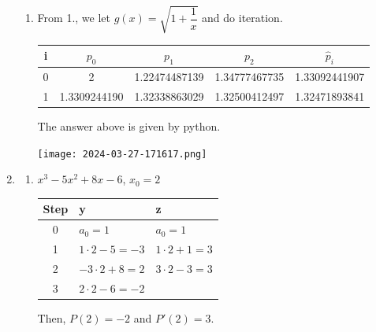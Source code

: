 \documentclass[12pt]{article}
\begin{document}
\begin{enumerate}
\begin{enumerate}
        \item From 1., we let $g(x) = \sqrt{1 + \dfrac{1}{x}}$ and do iteration.
        
        \begin{center}
            \begin{tabular}{|c|c|c|c||c|}
                \hline
                i & $p_0$ & $p_1$ & $p_2$ & $\hat{p}_i$ \\
                \hline
                0 & 2 & 1.22474487139 & 1.34777467735 & 1.33092441907\\
                1 & 1.3309244190 & 1.32338863029 & 1.32500412497 & 1.32471893841\\
                \hline
            \end{tabular}
        \end{center}

        The answer above is given by python.

        \texttt{[image: 2024-03-27-171617.png]}
    \end{enumerate}

    \item \begin{enumerate}
        \item $x^3 - 5x^2 + 8x -6$, $x_0 = 2$
        
        \begin{tabular}{|c||l|l|}
            \hline
            Step & y & z\\
            \hline
            0 & $a_0 = 1$ & $a_0 = 1$\\
            1 & $1 \cdot 2 - 5 = -3$ & $1 \cdot 2 + 1 = 3$\\
            2 & $-3 \cdot 2 + 8 = 2$ & $3 \cdot 2 - 3 = 3$\\
            3 & $2 \cdot 2 - 6 = -2$ & \\
            \hline
        \end{tabular}

        Then, $P(2) = -2$ and $P'(2)=3$.
    \end{enumerate}
\end{enumerate}
\end{document}
